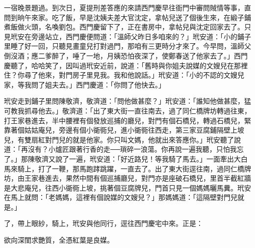 一宿晚景題過。到次日，夏提刑差答應的來請西門慶早往衙門中審問賊情等事，直問到晌午來家。吃了飯，早是沈姨夫差大官沈定，拿帖兒送了個後生來，在緞子鋪煮飯做火頭，名喚劉包。西門慶留下了，正在書房中，拿帖兒與沈定回家去了。只見玳安在旁邊站立，西門慶便問道：「溫師父昨日多咱來的？」玳安道：「小的鋪子里睡了好一回，只聽見畫童兒打對過門，那咱有三更時分才來了。今早問，溫師父倒沒酒；應二爹醉了，唾了一地，月姨恐怕夜深了，使鄭春送了他家去了。」西門慶聽了，哈哈笑了，因叫過玳安近前，說道：「舊時與你姐夫說媒的文嫂兒在那裡住？你尋了他來，對門房子里見我。我和他說話。」玳安道：「小的不認的文嫂兒家，等我問了姐夫去。」西門慶道：「你問了他快去。」

玳安走到鋪子里問陳敬濟，敬濟道：「問他做甚麼？」玳安道：「誰知他做甚麼，猛可教我抓尋他去。」敬濟道：「出了東大街一直往南去，過了同仁橋牌坊轉過往東，打王家巷進去，半中腰裡有個發放巡捕的廳兒，對門有個石橋兒，轉過石橋兒，緊靠著個姑姑庵兒，旁邊有個小衚衕兒，進小衚衕往西走，第三家豆腐鋪隔壁上坡兒，有雙扇紅對門兒的就是他家。你只叫文媽，他就出來答應你。」玳安聽了說道：「再沒有？小爐匠跟著行香的走──瑣碎一浪蕩。你再說一遍我聽，只怕我忘了。」那陳敬濟又說了一遍，玳安道：「好近路兒！等我騎了馬去。」一面牽出大白馬來騎上，打了一鞭，那馬跑踍跳躍，一直去了。出了東大街逕往南，過同仁橋牌坊，由王家巷進去，果然中間有個巡捕廳兒，對門亦是座破石橋兒，里首半截紅牆是大悲庵兒，往西小衚衕上坡，挑著個豆腐牌兒，門首只見一個媽媽曬馬糞。玳安在馬上就問：「老媽媽，這裡有個說媒的文嫂兒？」那媽媽道：「這隔壁對門兒就是。」

了，帶上眼紗，騎上，玳安與他同行，逕往西門慶宅中來。正是：

欲向深閨求艷質，全憑紅葉是良媒。


